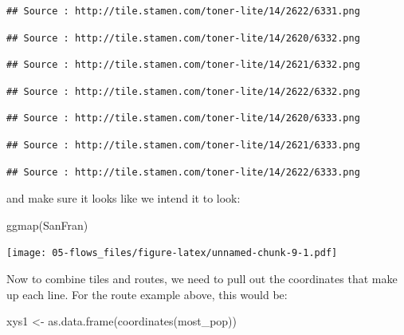\documentclass[
]{book}
\newenvironment{Shaded}{\begin{snugshade}}{\end{snugshade}}
\newcommand{\FunctionTok}[1]{\textcolor[rgb]{0.00,0.00,0.00}{#1}}
\newcommand{\NormalTok}[1]{#1}
\newcommand{\OtherTok}[1]{\textcolor[rgb]{0.56,0.35,0.01}{#1}}
\begin{document}
\begin{verbatim}
## Source : http://tile.stamen.com/toner-lite/14/2622/6331.png
\end{verbatim}

\begin{verbatim}
## Source : http://tile.stamen.com/toner-lite/14/2620/6332.png
\end{verbatim}

\begin{verbatim}
## Source : http://tile.stamen.com/toner-lite/14/2621/6332.png
\end{verbatim}

\begin{verbatim}
## Source : http://tile.stamen.com/toner-lite/14/2622/6332.png
\end{verbatim}

\begin{verbatim}
## Source : http://tile.stamen.com/toner-lite/14/2620/6333.png
\end{verbatim}

\begin{verbatim}
## Source : http://tile.stamen.com/toner-lite/14/2621/6333.png
\end{verbatim}

\begin{verbatim}
## Source : http://tile.stamen.com/toner-lite/14/2622/6333.png
\end{verbatim}

and make sure it looks like we intend it to look:

\begin{Shaded}
\begin{Highlighting}[]
\FunctionTok{ggmap}\NormalTok{(SanFran)}
\end{Highlighting}
\end{Shaded}

\texttt{[image: 05-flows\_files/figure-latex/unnamed-chunk-9-1.pdf]}

Now to combine tiles and routes, we need to pull out the coordinates that make up each line. For the route example above, this would be:

\begin{Shaded}
\begin{Highlighting}[]
\NormalTok{xys1 }\OtherTok{\textless{}{-}} \FunctionTok{as.data.frame}\NormalTok{(}\FunctionTok{coordinates}\NormalTok{(most\_pop))}
\end{Highlighting}
\end{Shaded}
\end{document}
